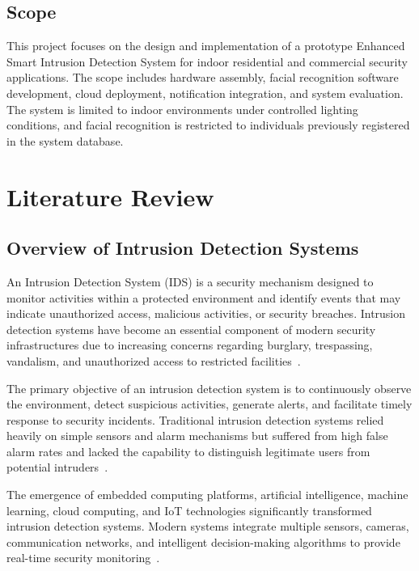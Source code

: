 \documentclass[12pt,a4paper,oneside]{report}
\begin{document}
\section{Scope}

This project focuses on the design and implementation of a prototype Enhanced Smart Intrusion Detection System for indoor residential and commercial security applications. The scope includes hardware assembly, facial recognition software development, cloud deployment, notification integration, and system evaluation. The system is limited to indoor environments under controlled lighting conditions, and facial recognition is restricted to individuals previously registered in the system database.

\chapter{Literature Review}

\section{Overview of Intrusion Detection Systems}

An Intrusion Detection System (IDS) is a security mechanism designed to monitor activities within a protected environment and identify events that may indicate unauthorized access, malicious activities, or security breaches. Intrusion detection systems have become an essential component of modern security infrastructures due to increasing concerns regarding burglary, trespassing, vandalism, and unauthorized access to restricted facilities~\cite{ref1,ref2}.

The primary objective of an intrusion detection system is to continuously observe the environment, detect suspicious activities, generate alerts, and facilitate timely response to security incidents. Traditional intrusion detection systems relied heavily on simple sensors and alarm mechanisms but suffered from high false alarm rates and lacked the capability to distinguish legitimate users from potential intruders~\cite{ref3}.

The emergence of embedded computing platforms, artificial intelligence, machine learning, cloud computing, and IoT technologies significantly transformed intrusion detection systems. Modern systems integrate multiple sensors, cameras, communication networks, and intelligent decision-making algorithms to provide real-time security monitoring~\cite{ref4,ref5}.
\end{document}
